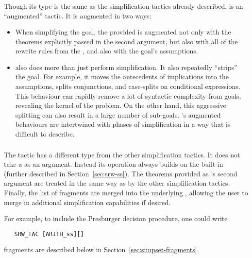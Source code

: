 \subsubsection{}

Though its type is the same as the simplification tactics already
described,  is an ``augmented'' tactic.  It is augmented
in two ways:
\begin{itemize}
\item When simplifying the goal, the provided \simpset{} is augmented
  not only with the theorems explicitly passed in the second argument,
  but also with all of the rewrite rules from the , and
  also with the goal's assumptions.
%
\item {} also does more than just perform simplification.
  It also repeatedly ``strips'' the goal.  For example, it moves the
  antecedents of implications into the assumptions, splits
  conjunctions, and case-splits on conditional expressions.  This
  behaviour can rapidly remove a lot of syntactic complexity from
  goals, revealing the kernel of the problem.  On the other hand, this
  aggressive splitting can also result in a large number of
  sub-goals.  's augmented behaviours are intertwined with
  phases of simplification in a way that is difficult to describe.
\end{itemize}

\subsubsection{}

The tactic  has a different type from the other
simplification tactics.  It does not take a \simpset{} as an argument.
Instead its operation always builds on the built-in \simpset{}
 (further described in Section~\ref{sec:srw-ss}).  The
theorems provided as 's second argument are treated in
the same way as by the other simplification tactics.  Finally, the
list of \simpset{} fragments are merged into the underlying
\simpset{}, allowing the user to merge in additional simplification
capabilities if desired.

For example, to include the Presburger decision procedure, one could
write
\begin{hol}
\begin{verbatim}
   SRW_TAC [ARITH_ss][]
\end{verbatim}
\end{hol}
\Simpset{} fragments are described below in
Section~\ref{sec:simpset-fragments}.

